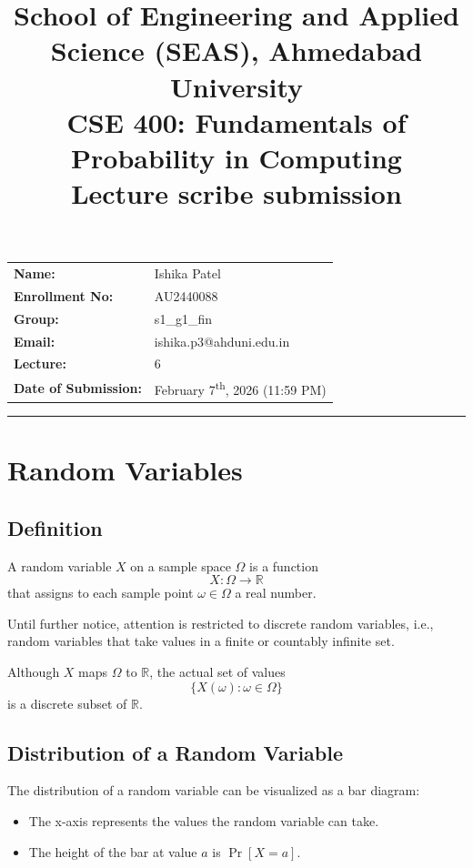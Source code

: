 \documentclass[11pt]{article}
\title{
    \normalsize School of Engineering and Applied Science (SEAS), Ahmedabad University \\
    \vspace{0.2cm}
    \textbf{CSE 400: Fundamentals of Probability in Computing}\\
    \Large Lecture scribe submission
}
\author{}
\date{}
\begin{document}
\maketitle

\vspace{-2cm}
\begin{center}
    \begin{tabular}{ll}
        \textbf{Name:} & Ishika Patel \\[1.5ex]
        \textbf{Enrollment No:} & AU2440088 \\[1.5ex]
        \textbf{Group:} & s1\_g1\_fin \\[1.5ex]
        \textbf{Email:} & ishika.p3@ahduni.edu.in \\[1.5ex]
        \textbf{Lecture:} & 6 \\[1.5ex]
        \textbf{Date of Submission:} & February 7\textsuperscript{th}, 2026 (11:59 PM)
    \end{tabular}
\end{center}

\hrule
\vspace{0.5cm}

\section{Random Variables}

\subsection{Definition}

A random variable $X$ on a sample space $\Omega$ is a function
\[
X : \Omega \rightarrow \mathbb{R}
\]
that assigns to each sample point $\omega \in \Omega$ a real number.

Until further notice, attention is restricted to discrete random variables, i.e., random variables that take values in a finite or countably infinite set.

Although $X$ maps $\Omega$ to $\mathbb{R}$, the actual set of values
\[
\{ X(\omega) : \omega \in \Omega \}
\]
is a discrete subset of $\mathbb{R}$.

\subsection{Distribution of a Random Variable}

The distribution of a random variable can be visualized as a bar diagram:
\begin{itemize}
    \item The x-axis represents the values the random variable can take.
    \item The height of the bar at value $a$ is $\Pr[X = a]$.
\end{itemize}
\end{document}
